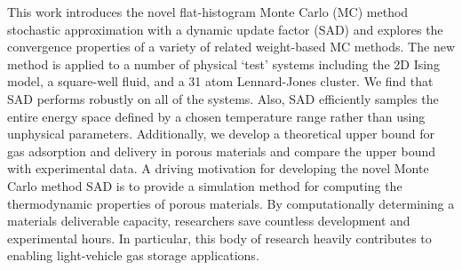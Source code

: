 This work introduces the novel flat-histogram Monte Carlo (MC) method
stochastic approximation with a dynamic update factor (SAD) and explores the
convergence properties of a variety of related weight-based MC methods. The new
method is applied to a number of physical `test’ systems including the 2D Ising
model, a square-well fluid, and a 31 atom Lennard-Jones cluster. We find that
SAD performs robustly on all of the systems. Also, SAD efficiently samples the
entire energy space defined by a chosen temperature range rather than using
unphysical parameters. Additionally, we develop a theoretical upper bound for
gas adsorption and delivery in porous materials and compare the upper bound with
experimental data.
A driving motivation for developing the novel Monte Carlo method SAD is to
provide a simulation method for computing the thermodynamic properties of
porous materials. By computationally determining a materials deliverable
capacity, researchers save countless development and experimental hours. In
particular, this body of research heavily contributes to enabling light-vehicle
gas storage applications.